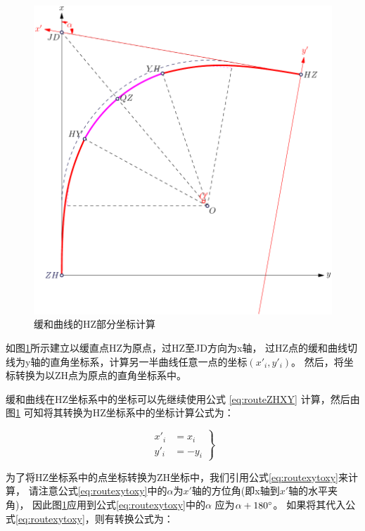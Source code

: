 \begin{enumerate}
\begin{figure}[htbp]
    \centering
    \includegraphics[scale=0.8]{route/RHY.pdf}
    \caption{缓和曲线的HZ部分坐标计算}
    \label{fig:RHY}
\end{figure}

如图\ref{fig:RHY}所示建立以缓直点HZ为原点，过HZ至JD方向为x轴，
过HZ点的缓和曲线切线为y轴的直角坐标系，计算另一半曲线任意一点的坐标$(x'_i, y'_i)$。
然后，将坐标转换为以ZH点为原点的直角坐标系中。

缓和曲线在HZ坐标系中的坐标可以先继续使用公式 \ref{eq:routeZHXY} 计算，然后由图\ref{fig:RHY}
可知将其转换为HZ坐标系中的坐标计算公式为：

\begin{equation}
\left . \begin{aligned}
x'_i &= x_i  \\
y'_i &= - y_i 
\end{aligned} \right \}
\label{eq:routeHZPtXY}
\end{equation}

为了将HZ坐标系中的点坐标转换为ZH坐标中，我们引用公式\ref{eq:routexytoxy}来计算，
请注意公式\ref{eq:routexytoxy}中的$\alpha$为$x'$轴的方位角(即x轴到$x'$轴的水平夹角)，
因此图\ref{fig:RHY}应用到公式\ref{eq:routexytoxy}中的$\alpha$ 应为$\alpha + 180 ^\circ $。
如果将其代入公式\ref{eq:routexytoxy}，则有转换公式为：


\end{enumerate}
